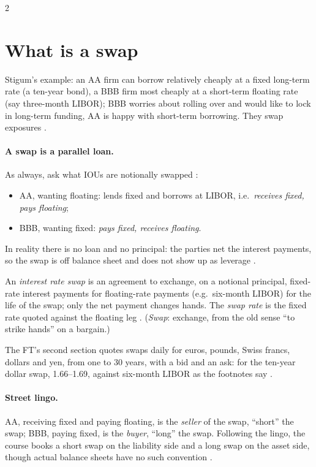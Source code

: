 \begin{paracol}{2}
\section{What is a swap}\label{sec:irs-what}

Stigum's example: an AA firm can borrow relatively cheaply at a fixed long-term rate (a ten-year bond), a BBB firm most cheaply at a short-term floating rate (say
three-month LIBOR); BBB worries about rolling over and would like to lock in long-term funding, AA is happy with short-term borrowing. They swap exposures
.

\paragraph{A swap is a parallel loan.} As always, ask what IOUs are notionally swapped :
\begin{itemize}
  \item AA, wanting floating: lends fixed and borrows at LIBOR, i.e.\ \emph{receives fixed, pays floating};
  \item BBB, wanting fixed: \emph{pays fixed, receives floating}.
\end{itemize}
In reality there is no loan and no principal: the parties net the interest payments, so the swap is off balance sheet and does not show up as leverage
.

\begin{definition}
An \emph{interest rate swap} is an agreement to exchange, on a notional principal, fixed-rate interest payments for floating-rate payments (e.g.\ six-month LIBOR)
for the life of the swap; only the net payment changes hands. The \emph{swap rate} is the fixed rate quoted against the floating leg .
(\emph{Swap}: exchange, from the old sense ``to strike hands'' on a bargain.)
\end{definition}

\begin{finance}
The FT's second section quotes swaps daily for euros, pounds, Swiss francs, dollars and yen, from one to 30 years, with a bid and an ask: for the ten-year dollar
swap, 1.66--1.69, against six-month LIBOR as the footnotes say .
\end{finance}

\paragraph{Street lingo.} AA, receiving fixed and paying floating, is the \emph{seller} of the swap, ``short'' the swap; BBB, paying fixed, is the \emph{buyer}, ``long''
the swap. Following the lingo, the course books a short swap on the liability side and a long swap on the asset side, though actual balance sheets have no such
convention .


\end{paracol}
